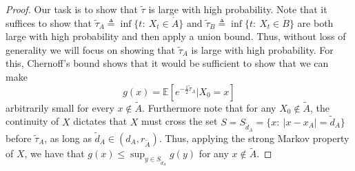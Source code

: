 \documentclass[english, aip, jcp, priprint, graphicx,floatfix]{revtex4-1}
\theoremstyle{plain}
\theoremstyle{definition}
\theoremstyle{plain}
\begin{document}
\begin{proof}
Our task is to show that $\tilde \tau$ is large with high probability.  Note that it suffices to show that $\tilde \tau_A \triangleq \inf\{t:\ X_t\in \dot A\}$ and $\tilde \tau_B \triangleq \inf\{t:\ X_t\in \dot B\}$ are both large with high probability and then apply a union bound.  Thus, without loss of generality we will focus on showing that $\tilde \tau_A$ is large with high probability.  For this, Chernoff's bound shows that it would be sufficient to show that we can make
\[
g(x)=\mathbb{E}[e^{-\frac{1}{2}\tilde \tau_A}|X_0=x]
\] 
arbitrarily small for every $x\notin \tilde A$.  Furthermore note that for any $X_0 \notin \tilde A$, the continuity of $X$ dictates that $X$ must cross the set $S=S_{\tilde d_A}=\{x:\ |x-x_A| = \tilde d_A\}$ before $\tilde \tau_A$, as long as $\tilde d_A \in (d_A,r_{\tilde A})$.  Thus, applying the strong Markov property of $X$, we have that $g(x)\leq \sup_{y\in S_{\tilde d_A}}g(y)$ for any $x \notin \tilde A$.


\end{proof}
\end{document}
